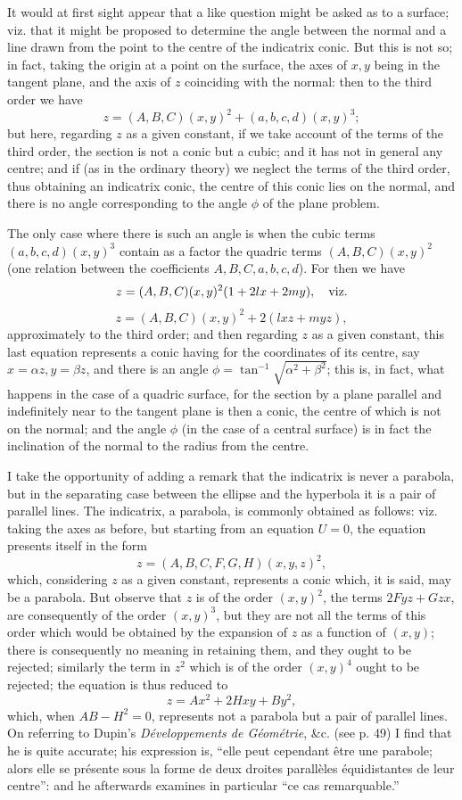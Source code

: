\documentclass[11pt,a4paper]{article}
\theoremstyle{plain}
\theoremstyle{definition}
\begin{document}
\noindent
It would at first sight appear that a like question might be asked as to a surface;
viz. that it might be proposed to determine the angle between the normal and a line
drawn from the point to the centre of the indicatrix conic. But this is not so; in
fact, taking the origin at a point on the surface, the axes of $x,y$ being in the
tangent plane, and the axis of $z$ coinciding with the normal: then to the third
order we have
\[
        z=(A,B,C)(x,y)^2+(a,b,c,d)(x,y)^3;
\]
but here, regarding $z$ as a given constant, if we take account of the terms of the
third order, the section is not a conic but a cubic; and it has not in general any
centre; and if (as in the ordinary theory) we neglect the terms of the third order,
thus obtaining an indicatrix conic, the centre of this conic lies on the normal, and
there is no angle corresponding to the angle $\phi$ of the plane problem.

The only case where there is such an angle is when the cubic terms
$(a,b,c,d)(x,y)^3$ contain as a factor the quadric terms $(A,B,C)(x,y)^2$ (one
relation between the coefficients $A,B,C,a,b,c,d$). For then we have
\[
        z=(A,B,C)(x,y)^2(1+2lx+2my),\quad\hbox{viz.}
\]
\[
        z=(A,B,C)(x,y)^2+2(lxz+myz),
\]
approximately to the third order; and then regarding $z$ as a given constant, this
last equation represents a conic having for the coordinates of its centre, say
$x=\alpha z,y=\beta z$, and there is an angle
$\phi=\tan^{-1}\sqrt{\alpha^2+\beta^2}$; this is, in fact, what happens in the case
of a quadric surface, for the section by a plane parallel and indefinitely near to the
tangent plane is then a conic, the centre of which is not on the normal; and the
angle $\phi$ (in the case of a central surface) is in fact the inclination of the normal
to the radius from the centre.

I take the opportunity of adding a remark that the indicatrix is never a parabola,
but in the separating case between the ellipse and the hyperbola it is a pair of
parallel lines. The indicatrix, a parabola, is commonly obtained as follows: viz.
taking the axes as before, but starting from an equation $U=0$, the equation
presents itself in the form
\[
        z=(A,B,C,F,G,H)(x,y,z)^2,
\]
which, considering $z$ as a given constant, represents a conic which, it is said,
may be a parabola. But observe that $z$ is of the order $(x,y)^2$, the terms
$2Fyz+Gzx$, are consequently of the order $(x,y)^3$, but they are not all the
terms of this order which would be obtained by the expansion of $z$ as a function
of $(x,y)$; there is consequently no meaning in retaining them, and they ought to
be rejected; similarly the term in $z^2$ which is of the order $(x,y)^4$ ought to
be rejected; the equation is thus reduced to
\[
        z=Ax^2+2Hxy+By^2,
\]
which, when $AB-H^2=0$, represents not a parabola but a pair of parallel lines.
On referring to Dupin's \textit{D\'eveloppements de G\'eom\'etrie}, \&c. (see p. 49)
I find that he is quite accurate; his expression is, ``elle peut cependant \^etre une
parabole; alors elle se pr\'esente sous la forme de deux droites parall\`eles
\'equidistantes de leur centre'': and he afterwards examines in particular ``ce cas
remarquable.''
\end{document}
